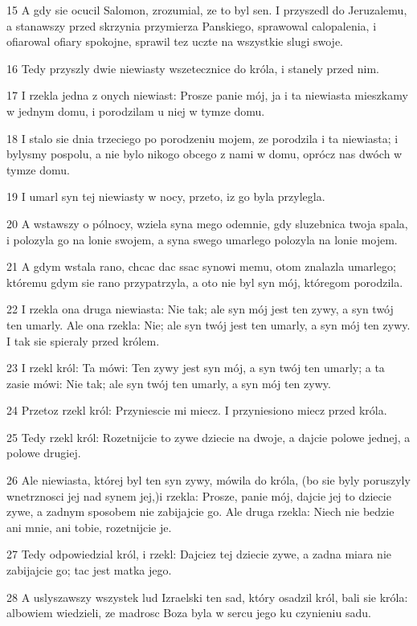 \par 15 A gdy sie ocucil Salomon, zrozumial, ze to byl sen. I przyszedl do Jeruzalemu, a stanawszy przed skrzynia przymierza Panskiego, sprawowal calopalenia, i ofiarowal ofiary spokojne, sprawil tez uczte na wszystkie slugi swoje.
\par 16 Tedy przyszly dwie niewiasty wszetecznice do króla, i stanely przed nim.
\par 17 I rzekla jedna z onych niewiast: Prosze panie mój, ja i ta niewiasta mieszkamy w jednym domu, i porodzilam u niej w tymze domu.
\par 18 I stalo sie dnia trzeciego po porodzeniu mojem, ze porodzila i ta niewiasta; i bylysmy pospolu, a nie bylo nikogo obcego z nami w domu, oprócz nas dwóch w tymze domu.
\par 19 I umarl syn tej niewiasty w nocy, przeto, iz go byla przylegla.
\par 20 A wstawszy o pólnocy, wziela syna mego odemnie, gdy sluzebnica twoja spala, i polozyla go na lonie swojem, a syna swego umarlego polozyla na lonie mojem.
\par 21 A gdym wstala rano, chcac dac ssac synowi memu, otom znalazla umarlego; któremu gdym sie rano przypatrzyla, a oto nie byl syn mój, któregom porodzila.
\par 22 I rzekla ona druga niewiasta: Nie tak; ale syn mój jest ten zywy, a syn twój ten umarly. Ale ona rzekla: Nie; ale syn twój jest ten umarly, a syn mój ten zywy. I tak sie spieraly przed królem.
\par 23 I rzekl król: Ta mówi: Ten zywy jest syn mój, a syn twój ten umarly; a ta zasie mówi: Nie tak; ale syn twój ten umarly, a syn mój ten zywy.
\par 24 Przetoz rzekl król: Przyniescie mi miecz. I przyniesiono miecz przed króla.
\par 25 Tedy rzekl król: Rozetnijcie to zywe dziecie na dwoje, a dajcie polowe jednej, a polowe drugiej.
\par 26 Ale niewiasta, której byl ten syn zywy, mówila do króla, (bo sie byly poruszyly wnetrznosci jej nad synem jej,)i rzekla: Prosze, panie mój, dajcie jej to dziecie zywe, a zadnym sposobem nie zabijajcie go. Ale druga rzekla: Niech nie bedzie ani mnie, ani tobie, rozetnijcie je.
\par 27 Tedy odpowiedzial król, i rzekl: Dajciez tej dziecie zywe, a zadna miara nie zabijajcie go; tac jest matka jego.
\par 28 A uslyszawszy wszystek lud Izraelski ten sad, który osadzil król, bali sie króla: albowiem wiedzieli, ze madrosc Boza byla w sercu jego ku czynieniu sadu.

